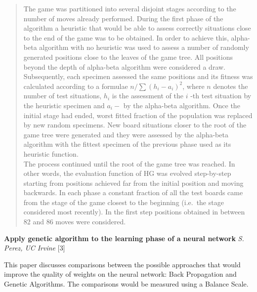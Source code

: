 \documentclass[]{article}
\begin{document}
\begin{quote}
The game was partitioned into several disjoint stages according to the
number of moves already performed. During the first phase of the
algorithm a heuristic that would be able to assess correctly situations
close to the end of the game was to be obtained. In order to achieve
this, alpha-beta algorithm with no heuristic was used to assess a number
of randomly generated positions close to the leaves of the game tree.
All positions beyond the depth of alpha-beta algorithm were considered a
draw. \\
Subsequently, each specimen assessed the same positions and its
fitness was calculated according to a formulae
\begin{math}n/\sum (h_i - a_i )^2\end{math}, where \begin{math}n\end{math} denotes the number of test
situations, \begin{math}h_i\end{math} is the assessment of the \begin{math}i\end{math} -th test situation by
the heuristic specimen and \begin{math}a_i-\end{math} by the alpha-beta algorithm. Once
the initial stage had ended, worst fitted fraction of the population was
replaced by new random specimens. New board situations closer to the
root of the game tree were generated and they were assessed by the
alpha-beta algorithm with the fittest specimen of the previous phase
used as its heuristic function. 
\\The process continued until the root of
the game tree was reached. In other words, the evaluation function of HG
was evolved step-by-step starting from positions achieved far from the
initial position and moving backwards. In each phase a constant fraction
of all the test boards came from the stage of the game closest to the
beginning (i.e.~the stage considered most recently). In the first step
positions obtained in between 82 and 86 moves were considered.
\end{quote}


\textbf{Apply genetic algorithm to the learning phase of a neural
network} \emph{S. Perez, UC Irvine} {[}3{]}

This paper discusses comparisons between the possible approaches that
would improve the quality of weights on the neural network: Back
Propagation and Genetic Algorithms. The comparisons would be measured
using a Balance Scale.
\end{document}
